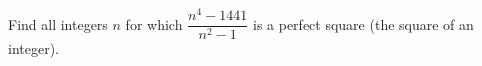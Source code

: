 Find all integers $n$ for which $\dfrac{n^4-1441}{n^2-1}$ is a perfect square (the square of an integer).
